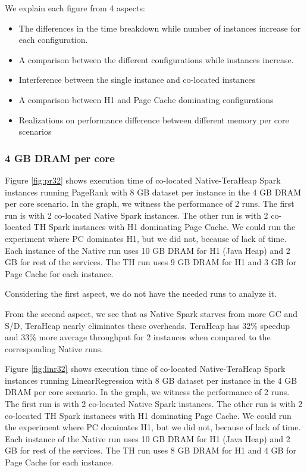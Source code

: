 We explain each figure from 4 aspects:
\begin{itemize}
\item{The differences in the time breakdown while number of instances increase for each configuration.}
\item{A comparison between the different configurations while instances increase.}
\item{Interference between the single instance and co-located instances}
\item{A comparison between H1 and Page Cache dominating configurations}
\item{Realizations on performance difference between different memory per core scenarios}
\end{itemize}


\subsubsection{4 GB DRAM per core}

Figure \ref{fig:pr32} shows execution time of co-located
Native-TeraHeap Spark instances running PageRank with 8 GB
dataset per instance in the 4 GB DRAM per core scenario.
In the graph, we witness the performance of 2 runs. The first run is with 2 co-located Native Spark instances.
The other run is with 2 co-located TH Spark instances with H1 dominating Page Cache.
We could run the experiment where PC dominates H1, but we did not, because of lack of time. 
Each instance of the Native run uses 10 GB DRAM for H1 (Java Heap) and 2 GB for rest of the services.
The TH run uses 9 GB DRAM for H1 and 3 GB for Page Cache for each instance.

Considering the first aspect, we do not have the needed runs to analyze it.

From the second aspect, we see that as Native Spark starves from more GC and S/D, TeraHeap nearly eliminates these overheads. TeraHeap has 32\% speedup and 33\% more average throughput for 2 instances when compared to the corresponding Native runs.

Figure \ref{fig:linr32} shows execution time of co-located
Native-TeraHeap Spark instances running LinearRegression with 8 GB
dataset per instance in the 4 GB DRAM per core scenario.
In the graph, we witness the performance of 2 runs. The first run is with 2 co-located Native Spark instances.
The other run is with 2 co-located TH Spark instances with H1 dominating Page Cache.
We could run the experiment where PC dominates H1, but we did not, because of lack of time.
Each instance of the Native run uses 10 GB DRAM for H1 (Java Heap) and 2 GB for rest of the services.
The TH run uses 8 GB DRAM for H1 and 4 GB for Page Cache for each instance.


